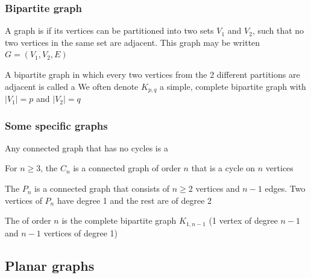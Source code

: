 \documentclass[aspectratio=169]{beamer}\usepackage[]{graphicx}\usepackage[]{xcolor}
\begin{document}
\begin{frame}\frametitle{Bipartite graph}
	\begin{definition}
		A graph is  if its vertices can be partitioned into two sets $V_1$ and $V_2$, such that no two vertices in the same set are adjacent.
		This graph may be written $G=(V_1,V_2,E)$
	\end{definition}
	\vfill
	\begin{definition}
		A bipartite graph in which every two vertices from the 2 different partitions are adjacent is called a 
		\vskip0.2cm
		We often denote $K_{p,q}$ a simple, complete bipartite graph with $|V_1|=p$ and $|V_2|=q$
	\end{definition}
\end{frame}

\begin{frame}\frametitle{Some specific graphs}
	\begin{definition}[{Tree}]
		Any connected graph that has no cycles is a 
	\end{definition}
	\begin{definition}[{Cycle $C_n$}]
		For $n\geq 3$, the  $C_n$ is a connected graph of order $n$ that is a cycle on $n$ vertices
	\end{definition}
	\begin{definition}[{Path $P_n$}]
		The  $P_n$ is a connected graph that consists of $n\geq 2$ vertices and $n-1$ edges. Two vertices of $P_n$ have degree 1 and the rest are of degree 2
	\end{definition}
	\begin{definition}[{Star $S_n$}]
		The  of order $n$ is the complete bipartite graph $K_{1,n-1}$ (1 vertex of degree $n-1$ and $n-1$ vertices of degree 1)
	\end{definition}
\end{frame}






\subsection{Planar graphs}
\end{document}
